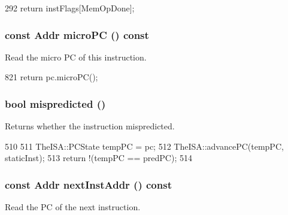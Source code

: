 \begin{DoxyCode}
292 { return instFlags[MemOpDone]; }
\end{DoxyCode}
\hypertarget{classBaseDynInst_a2a36b9c5ead1c8f50bde6b401d18b1b3}{
\subsubsection[{microPC}]{\setlength{\rightskip}{0pt plus 5cm}const {\bf Addr} microPC () const}}
\label{classBaseDynInst_a2a36b9c5ead1c8f50bde6b401d18b1b3}
Read the micro PC of this instruction. 


\begin{DoxyCode}
821 { return pc.microPC(); }
\end{DoxyCode}
\hypertarget{classBaseDynInst_a821a18b4aa4e70533b1df605037062cd}{
\subsubsection[{mispredicted}]{\setlength{\rightskip}{0pt plus 5cm}bool mispredicted ()}}
\label{classBaseDynInst_a821a18b4aa4e70533b1df605037062cd}
Returns whether the instruction mispredicted. 


\begin{DoxyCode}
510     {
511         TheISA::PCState tempPC = pc;
512         TheISA::advancePC(tempPC, staticInst);
513         return !(tempPC == predPC);
514     }
\end{DoxyCode}
\hypertarget{classBaseDynInst_ab8d2b7c268f277488b0f62e209e93f36}{
\subsubsection[{nextInstAddr}]{\setlength{\rightskip}{0pt plus 5cm}const {\bf Addr} nextInstAddr () const}}
\label{classBaseDynInst_ab8d2b7c268f277488b0f62e209e93f36}
Read the PC of the next instruction. 


